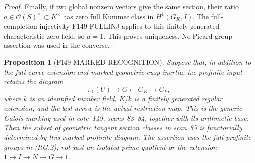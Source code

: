 \documentclass[11pt,a4paper]{article}
\newtheorem{proposition}[theorem]{Proposition}
\theoremstyle{definition}
\begin{document}
\begin{proof}
Finally, if two global nonzero vectors give the same section,
their ratio $a\in\mathcal O(S)^\times\subset K^\times$ has zero
full Kummer class in $H^1(G_K,I)$. The full-completion injectivity
F149-FULLINJ applies to this finitely generated characteristic-zero
field, so $a=1$. This proves uniqueness. No Picard-group assertion
was used in the converse.
\end{proof}

\begin{proposition}[F149-MARKED-RECOGNITION]
\label{prop:archive-marked-recognition}
Suppose that, in addition to the full curve extension and marked
geometric cusp inertia, the profinite input retains the diagram
\[
 \pi_1(U)\longrightarrow G\longleftarrow G_K
     \longrightarrow G_k,                                  \tag{RG.2}
\]
where $k$ is an identified number field, $K/k$ is a finitely
generated regular extension, and the last arrow is the actual
restriction map. This is the generic Galois marking used in
cote~149, scans~83--84, together with its arithmetic base.
Then the subset of geometric tangent section classes in scan~85
is functorially determined by this marked profinite diagram.
The assertion uses the full profinite groups in \textup{(RG.2)},
not just an isolated prime quotient or the extension $1\to I\to N\to G\to1$.
\end{proposition}
\end{document}
